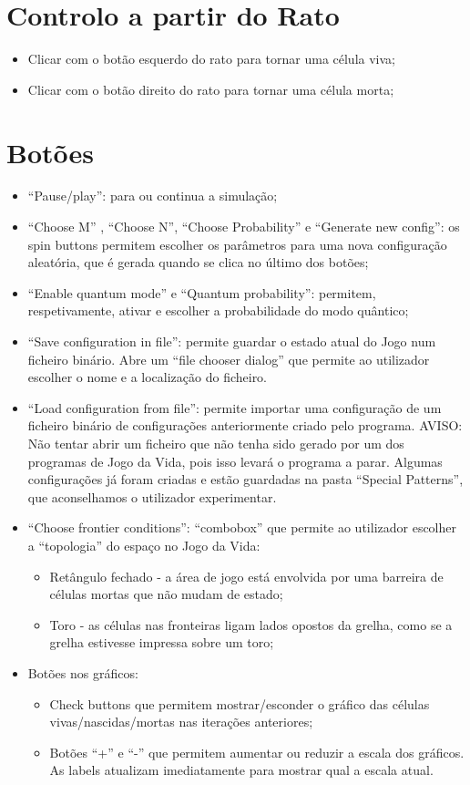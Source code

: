 \documentclass[a4paper,11pt]{book}
\begin{document}
\section{Controlo a partir do Rato}
  \begin{itemize}
      \item Clicar com o botão esquerdo do rato para tornar uma célula viva;
      \item Clicar com o botão direito do rato para tornar uma célula morta;
  \end{itemize}

\section{Botões}
\begin{itemize}
    \item “Pause/play”: para ou continua a simulação;
    \item “Choose M” , “Choose N”,  “Choose Probability” e “Generate new config”: os spin buttons permitem escolher os parâmetros para uma nova configuração aleatória, que é gerada quando se clica no último dos botões;
    \item “Enable quantum mode” e “Quantum probability”: permitem, respetivamente, ativar e escolher a probabilidade do modo quântico;
    \item “Save configuration in file”: permite guardar o estado  atual do Jogo num ficheiro binário. Abre um “file chooser dialog” que permite ao utilizador escolher o nome e a localização do ficheiro.
    \item “Load configuration from file”: permite importar uma configuração de um ficheiro binário de configurações anteriormente criado pelo programa. AVISO: Não tentar abrir um ficheiro que não tenha sido gerado por um dos programas de Jogo da Vida, pois isso levará o programa a parar. Algumas configurações já foram criadas e estão guardadas na pasta “Special Patterns”, que aconselhamos o utilizador experimentar.
    \item “Choose frontier conditions”: “combobox” que permite ao utilizador escolher a “topologia” do espaço no Jogo da Vida:
    \begin{itemize}
      \item Retângulo fechado - a área de jogo está envolvida por uma barreira de células mortas que não mudam de estado;
      \item Toro - as células nas fronteiras ligam lados opostos da grelha, como se a grelha estivesse impressa sobre um toro;
    \end{itemize}
    \item Botões nos gráficos:
    \begin{itemize}
      \item Check buttons que permitem mostrar/esconder o gráfico das células vivas/nascidas/mortas nas iterações anteriores;
      \item Botões “+” e “-” que permitem aumentar ou reduzir a escala dos gráficos. As labels atualizam imediatamente para mostrar qual a escala atual.
    \end{itemize}
\end{itemize}
\end{document}

